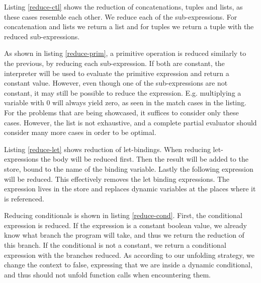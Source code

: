 

Listing \ref{reduce-ctl} shows the reduction of concatenations, tuples and lists, as these cases resemble each other. We reduce each of the sub-expressions. For concatenation and lists we return a list and for tuples we return a tuple with the reduced sub-expressions.



As shown in listing \ref{reduce-prim}, a primitive operation is reduced similarly to the previous, by reducing each sub-expression. If both are constant, the interpreter will be used to evaluate the primitive expression and return a constant value. However, even though one of the sub-expressions are not constant, it may still be possible to reduce the expression. E.g. multiplying a variable with 0 will always yield zero, as seen in the match cases in the listing. For the problems that are being showcased, it suffices to consider only these cases. However, the list is not exhaustive, and a complete partial evaluator should consider many more cases in order to be optimal.



Listing \ref{reduce-let} shows reduction of let-bindings. When reducing let-expressions the body will be reduced first. Then the result will be added to the store, bound to the name of the binding variable. Lastly the following expression will be reduced. This effectively removes the let binding expressions. The expression lives in the store and replaces dynamic variables at the places where it is referenced.



Reducing conditionals is shown in listing \ref{reduce-cond}. First, the conditional expression is reduced. If the expression is a constant boolean value, we already know what branch the program will take, and thus we return the reduction of this branch. If the conditional is not a constant, we return a conditional expression with the branches reduced. As according to our unfolding strategy, we change the context to false, expressing that we are inside a dynamic conditional, and thus should not unfold function calls when encountering them.

